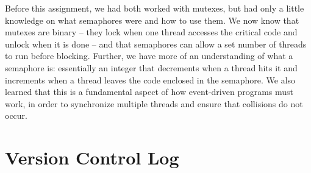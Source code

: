 \documentclass[letterpaper, onecolumn, draftclsnofoot, 10pt, compsoc]{IEEEtran}
\begin{document}
\begin{singlespace}
            Before this assignment, we had both worked with mutexes, but had only a little knowledge on what semaphores were and how to use them. 
            We now know that mutexes are binary -- they lock when one thread accesses the critical code and unlock when it is done -- and that semaphores can allow a set number of threads to run before blocking. 
            Further, we have more of an understanding of what a semaphore is: essentially an integer that decrements when a thread hits it and increments when a thread leaves the code enclosed in the semaphore.
            We also learned that this is a fundamental aspect of how event-driven programs must work, in order to synchronize multiple threads and ensure that collisions do not occur.
            \par
    \end{singlespace}

\section{Version Control Log}
    
    
\end{document}
